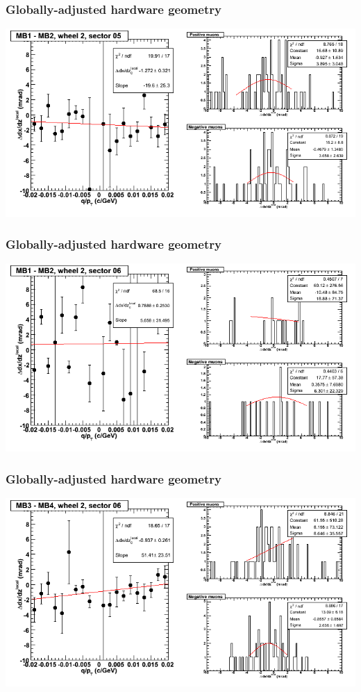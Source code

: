 \documentclass[compress]{beamer}
\begin{document}
\begin{frame}
\frametitle{Globally-adjusted hardware geometry}
\includegraphics[width=\linewidth]{NOV4_segdiffs_HW/dt13_slope_E_05_12.png}
\end{frame}

\begin{frame}
\frametitle{Globally-adjusted hardware geometry}
\includegraphics[width=\linewidth]{NOV4_segdiffs_HW/dt13_slope_E_06_12.png}
\end{frame}

\begin{frame}
\frametitle{Globally-adjusted hardware geometry}
\includegraphics[width=\linewidth]{NOV4_segdiffs_HW/dt13_slope_E_06_34.png}
\end{frame}
\end{document}
